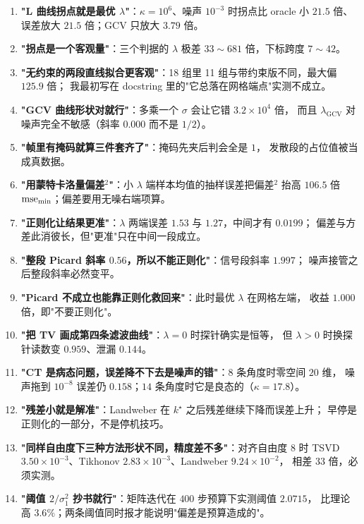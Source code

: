 \begin{enumerate}
  \item \textbf{"L 曲线拐点就是最优 $\lambda$"}：$\kappa=10^6$、噪声 $10^{-3}$ 时拐点比
        oracle 小 $21.5$ 倍、误差放大 $21.5$ 倍；GCV 只放大 $3.79$ 倍。
  \item \textbf{"拐点是一个客观量"}：三个判据的 $\lambda$ 极差 $33\sim681$ 倍，下标跨度 $7\sim42$。
  \item \textbf{"无约束的两段直线拟合更客观"}：18 组里 11 组与带约束版不同，最大偏 $125.9$ 倍；
        我最初写在 docstring 里的"它总落在网格端点"实测不成立。
  \item \textbf{"GCV 曲线形状对就行"}：多乘一个 $\sigma$ 会让它错 $3.2\times10^4$ 倍，
        而且 $\lambda_{\mathrm{GCV}}$ 对噪声完全不敏感（斜率 $0.000$ 而不是 $1/2$）。
  \item \textbf{"帧里有掩码就算三件套齐了"}：掩码先夹后判会全是 $1$，
        发散段的占位值被当成真数据。
  \item \textbf{"用蒙特卡洛量偏差$^2$"}：小 $\lambda$ 端样本均值的抽样误差把偏差$^2$ 抬高
        $106.5$ 倍 ${\rm mse}_{\min}$；偏差要用无噪右端项算。
  \item \textbf{"正则化让结果更准"}：$\lambda$ 两端误差 $1.53$ 与 $1.27$，中间才有 $0.0199$；
        偏差与方差此消彼长，但"更准"只在中间一段成立。
  \item \textbf{"整段 Picard 斜率 $0.56$，所以不能正则化"}：信号段斜率 $1.997$；
        噪声接管之后整段斜率必然变平。
  \item \textbf{"Picard 不成立也能靠正则化救回来"}：此时最优 $\lambda$ 在网格左端，
        收益 $1.000$ 倍，即"不要正则化"。
  \item \textbf{"把 TV 画成第四条滤波曲线"}：$\lambda=0$ 时探针确实是恒等，
        但 $\lambda>0$ 时换探针读数变 $0.959$、泄漏 $0.144$。
  \item \textbf{"CT 是病态问题，误差降不下去是噪声的错"}：$8$ 条角度时零空间 $20$ 维，
        噪声拖到 $10^{-8}$ 误差仍 $0.158$；$14$ 条角度时它是良态的（$\kappa=17.8$）。
  \item \textbf{"残差小就是解准"}：Landweber 在 $k^\star$ 之后残差继续下降而误差上升；
        早停是正则化的一部分，不是停机技巧。
  \item \textbf{"同样自由度下三种方法形状不同，精度差不多"}：对齐自由度 $8$ 时
        TSVD $3.50\times10^{-3}$、Tikhonov $2.83\times10^{-3}$、Landweber $9.24\times10^{-2}$，
        相差 $33$ 倍，必须实测。
  \item \textbf{"阈值 $2/\sigma_1^2$ 抄书就行"}：矩阵迭代在 $400$ 步预算下实测阈值 $2.0715$，
        比理论高 $3.6\%$；两条阈值同时报才能说明"偏差是预算造成的"。
\end{enumerate}
